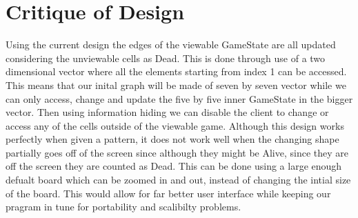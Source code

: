 \documentclass[12pt]{article}
\begin{document}
\section* {Critique of Design}

Using the current design the edges of the viewable GameState are all updated considering the unviewable cells as Dead. This is done through use of a two dimensional vector where all the elements starting from index 1 can be accessed. This means that our inital graph will be made of seven by seven vector while we can only access, change and update the five by five  inner GameState in the bigger vector. Then using information hiding we can disable the client to change or access any of the cells outside of the viewable game. Although this design works perfectly when given a pattern, it does not work well when the changing shape partially goes off of the screen since although they might be Alive, since they are off the screen they are counted as Dead. This can be done using a large enough defualt board which can be zoomed in and out, instead of changing the intial size of the board. This would allow for far better user interface while keeping our pragram in tune for portability and scalibilty problems. 
\enddocument 
\end{document}
